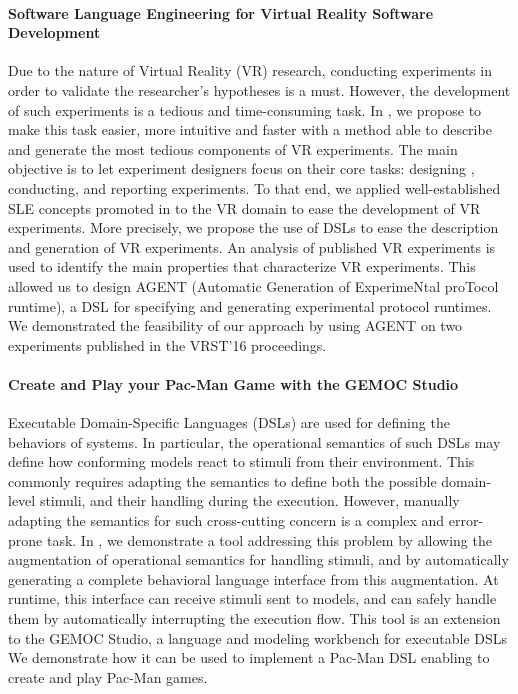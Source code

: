 \paragraph{Software Language Engineering for Virtual Reality Software Development}

Due to the nature of Virtual Reality (VR) research, conducting experiments in order to validate the researcher's hypotheses is a must. 
However, the development of such experiments is a tedious and time-consuming task. 
In \cite{lemoulec:hal-01549042}, we propose to make this task easier, more intuitive and faster with a method able to describe and generate the most tedious components of VR experiments. 
The main objective is to let experiment designers focus on their core tasks: designing , conducting, and reporting experiments. 
To that end, we applied well-established SLE concepts promoted in \team{} to the VR domain to ease the development of VR experiments.
More precisely, we propose the use of DSLs to ease the description and generation of VR experiments. 
An analysis of published VR experiments is used to identify the main properties that characterize VR experiments. 
This allowed us to design AGENT (Automatic Generation of ExperimeNtal proTocol runtime), a DSL for specifying and generating experimental protocol runtimes. 
We demonstrated the feasibility of our approach by using AGENT on two experiments published in the VRST'16 proceedings. 

\paragraph{Create and Play your Pac-Man Game with the GEMOC Studio}

Executable Domain-Specific Languages (DSLs) are used for defining the behaviors of systems. In particular, the
operational semantics of such DSLs may define how conforming
models react to stimuli from their environment. This commonly
requires adapting the semantics to define both the possible
domain-level stimuli, and their handling during the execution.
However, manually adapting the semantics for such cross-cutting
concern is a complex and error-prone task. In \cite{}, we
demonstrate a tool addressing this problem by allowing the
augmentation of operational semantics for handling stimuli, and
by automatically generating a complete behavioral language
interface from this augmentation. At runtime, this interface can receive stimuli sent to models, and can safely handle them by automatically interrupting the execution flow. This tool is an extension to the GEMOC Studio, a language and modeling
workbench for executable DSLs We demonstrate how it can be
used to implement a Pac-Man DSL enabling to create and play
Pac-Man games.

